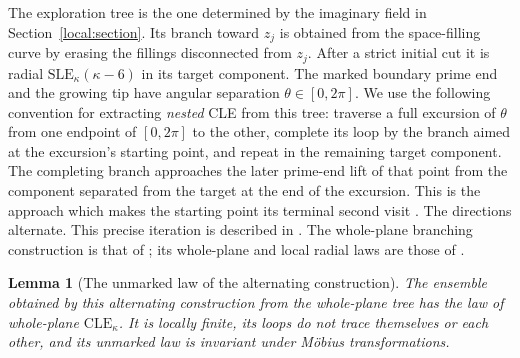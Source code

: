 \documentclass[11pt]{article}
\numberwithin{equation}{section}
\newtheorem{lemma}[theorem]{Lemma}
\theoremstyle{definition}
\theoremstyle{remark}
\newcommand{\1}{\mathbf 1}
\begin{document}
The exploration tree is the one determined by the imaginary field in
Section~\ref{local:section}.  Its branch toward $z_j$ is obtained from the
space-filling curve by erasing the fillings disconnected from $z_j$.
After a strict initial cut it is radial
$\mathrm{SLE}_{\kappa}(\kappa-6)$ in its target component.  The marked
boundary prime end and the growing tip have angular separation
$\theta\in[0,2\pi]$.  We use the following convention for extracting
\emph{nested} CLE from this tree: traverse a full excursion of $\theta$
from one endpoint of $[0,2\pi]$ to the other, complete its loop by the
branch aimed at the excursion's starting point, and repeat in the
remaining target component.  The completing branch approaches the
later prime-end lift of that point from the component separated from
the target at the end of the excursion.  This is the approach which
makes the starting point its terminal second visit
\cite[Section~2.1.6 and Figure~4]{AruHoldenPowellSunCritical}.
The directions alternate.  This precise
iteration is described in
\cite[Remark~2.3 and Sections~2.1.6--2.1.7]{AruHoldenPowellSunCritical}.
The whole-plane branching construction is that of
\cite[Section~2.3.1]{GwynneMillerQianCLE}; its whole-plane and local
radial laws are those of \cite[Section~2.1.3]{MillerSheffieldIGIV}.

\begin{lemma}[The unmarked law of the alternating construction]
\label{loop:ensemble-law}
The ensemble obtained by this alternating construction from the
whole-plane tree has the law of whole-plane $\mathrm{CLE}_{\kappa}$.
It is locally finite, its loops do not trace themselves or each other,
and its unmarked law is invariant under M\"obius transformations.
\end{lemma}
\end{document}

